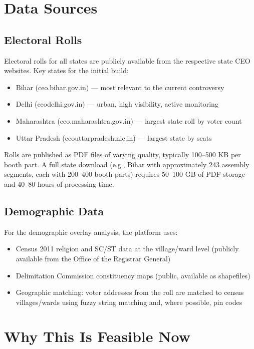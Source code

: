 \documentclass[11pt, a4paper]{article}
\begin{document}
\section{Data Sources}

\subsection{Electoral Rolls}

Electoral rolls for all states are publicly available from the respective state CEO websites. Key states for the initial build:

\begin{itemize}[leftmargin=1.5em, itemsep=3pt]
  \item Bihar (ceo.bihar.gov.in) --- most relevant to the current controversy
  \item Delhi (ceodelhi.gov.in) --- urban, high visibility, active monitoring
  \item Maharashtra (ceo.maharashtra.gov.in) --- largest state roll by voter count
  \item Uttar Pradesh (ceouttarpradesh.nic.in) --- largest state by seats
\end{itemize}

Rolls are published as PDF files of varying quality, typically 100--500 KB per booth part. A full state download (e.g., Bihar with approximately 243 assembly segments, each with 200--400 booth parts) requires 50--100 GB of PDF storage and 40--80 hours of processing time.

\subsection{Demographic Data}

For the demographic overlay analysis, the platform uses:

\begin{itemize}[leftmargin=1.5em, itemsep=3pt]
  \item Census 2011 religion and SC/ST data at the village/ward level (publicly available from the Office of the Registrar General)
  \item Delimitation Commission constituency maps (public, available as shapefiles)
  \item Geographic matching: voter addresses from the roll are matched to census villages/wards using fuzzy string matching and, where possible, pin codes
\end{itemize}

\section{Why This Is Feasible Now}
\end{document}
